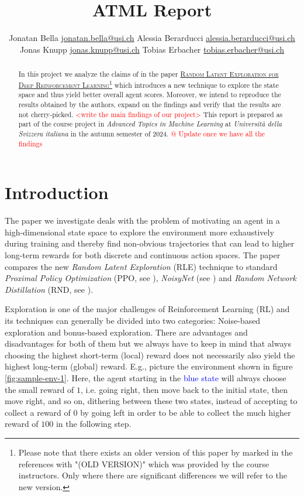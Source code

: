 \documentclass[10pt]{article} %
\title{ATML Report}
\author{%
  \name Jonatan Bella \email \href{mailto:jonatan.bella@usi.ch}{jonatan.bella@usi.ch}
  \AND
  \name Alessia Berarducci \email \href{mailto:alessia.berarducci@usi.ch}{alessia.berarducci@usi.ch}
  \AND
  \name Jonas Knupp \email \href{mailto:jonas.knupp@usi.ch}{jonas.knupp@usi.ch}
  \AND
  \name Tobias Erbacher \email \href{mailto:tobias.erbacher@usi.ch}{tobias.erbacher@usi.ch}
}
\begin{document}
\maketitle

\begin{abstract}
In this project we analyze the claims of \cite{rle-paper} in the paper \href{https://arxiv.org/abs/2407.13755}{\textsc{Random Latent Exploration for Deep Reinforcement Learning}}\footnote{Please note that there exists an older version of this paper by \cite{rle-paper-old} marked in the references with "(OLD VERSION)" which was provided by the course instructors. Only where there are significant differences we will refer to the new version.} which introduces a new technique to explore the state space and thus yield better overall agent scores. Moreover, we intend to reproduce the results obtained by the authors, expand on the findings and verify that the results are not cherry-picked. \textcolor{red}{<write the main findings of our project>} This report is prepared as part of the course project in \textit{Advanced Topics in Machine Learning} at \textit{Università della Svizzera italiana} in the autumn semester of 2024. \textcolor{red}{@ Update once we have all the findings}
\end{abstract}


\section{Introduction}
\noindent The paper we investigate deals with the problem of motivating an agent in a high-dimensional state space to explore the environment more exhaustively during training and thereby find non-obvious trajectories that can lead to higher long-term rewards for both discrete and continuous action spaces. The paper compares the new \textit{Random Latent Exploration} (RLE) technique to standard \textit{Proximal Policy Optimization} (PPO, see \cite{ppo-paper}), \textit{NoisyNet} (see \cite{noisynet-paper}) and \textit{Random Network Distillation} (RND, see \cite{rnd-paper}).

\noindent Exploration is one of the major challenges of Reinforcement Learning (RL) and its techniques can generally be divided into two categories: Noise-based exploration and bonus-based exploration. There are advantages and disadvantages for both of them but we always have to keep in mind that always choosing the highest short-term (local) reward does not necessarily also yield the highest long-term (global) reward. E.g., picture the environment shown in figure \ref{fig:sample-env-1}. Here, the agent starting in the \textcolor{blue}{blue state} will always choose the small reward of $1$, i.e. going right, then move back to the initial state, then move right, and so on, dithering between these two states, instead of accepting to collect a reward of $0$ by going left in order to be able to collect the much higher reward of $100$ in the following step.
\end{document}
